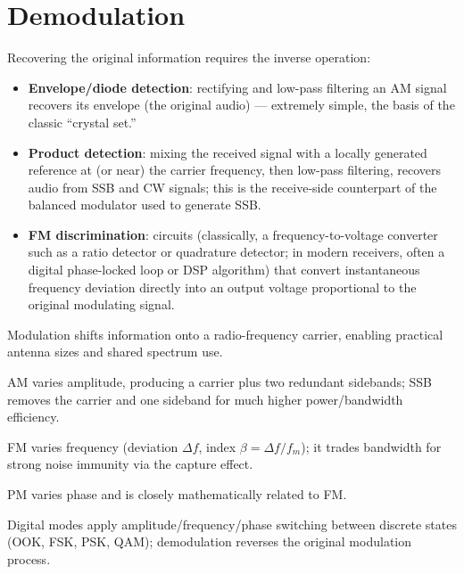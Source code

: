 \section{Demodulation}

Recovering the original information requires the inverse operation:

\begin{itemize}
\item \textbf{Envelope/diode detection}: rectifying and low-pass
filtering an AM signal recovers its envelope (the original audio) ---
extremely simple, the basis of the classic ``crystal set.''
\item \textbf{Product detection}: mixing the received signal with a
locally generated reference at (or near) the carrier frequency, then
low-pass filtering, recovers audio from SSB and CW signals; this is the
receive-side counterpart of the balanced modulator used to generate SSB.
\item \textbf{FM discrimination}: circuits (classically, a
frequency-to-voltage converter such as a ratio detector or quadrature
detector; in modern receivers, often a digital phase-locked loop or DSP
algorithm) that convert instantaneous frequency deviation directly into
an output voltage proportional to the original modulating signal.
\end{itemize}

\begin{quickreview}
\item Modulation shifts information onto a radio-frequency carrier,
enabling practical antenna sizes and shared spectrum use.
\item AM varies amplitude, producing a carrier plus two redundant
sidebands; SSB removes the carrier and one sideband for much higher
power/bandwidth efficiency.
\item FM varies frequency (deviation $\Delta f$, index $\beta =
\Delta f/f_m$); it trades bandwidth for strong noise immunity via the
capture effect.
\item PM varies phase and is closely mathematically related to FM.
\item Digital modes apply amplitude/frequency/phase switching between
discrete states (OOK, FSK, PSK, QAM); demodulation reverses the original
modulation process.
\end{quickreview}

